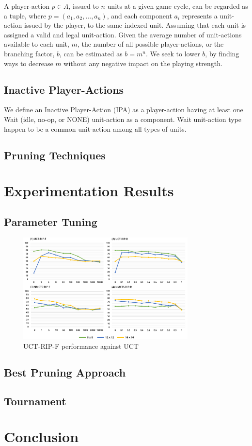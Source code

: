 \documentclass[conference]{IEEEtran}
\begin{document}
A player-action $p \in A$, issued to $n$ units at a given game cycle, can be regarded as a tuple, where $p = (a_1, a_2, \dots, a_n)$, and each component $a_i$ represents a unit-action issued by the player, to the same-indexed unit. Assuming that each unit is assigned a valid and legal unit-action. Given the average number of unit-actions available to each unit, $m$, the number of all possible player-actions, or the branching factor, $b$, can be estimated as $b = m^n$. We seek to lower $b$, by finding ways to decrease $m$ without any negative impact on the playing strength. 

\subsection{Inactive Player-Actions}

We define an Inactive Player-Action (IPA) as a player-action having at least one Wait (idle, no-op, or NONE) unit-action as a component. Wait unit-action type happen to be a common unit-action among all types of units.

\subsection{Pruning Techniques}

\section{Experimentation Results}

\subsection{Parameter Tuning}


\begin{figure}[!h]
\begin{center}
	\includegraphics[width=0.8\textwidth]{figs/PT.pdf}
	\caption{UCT-RIP-F performance against UCT}
	\label{PT}
\end{center}
\end{figure}

\subsection{Best Pruning Approach}

\subsection{Tournament}

\section{Conclusion}



\end{document}
